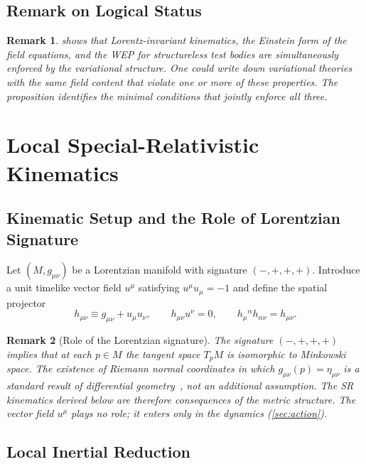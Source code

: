 \documentclass[12pt,a4paper]{article}
\newtheorem{remark}{Remark}
\begin{document}
\subsection{Remark on Logical Status}

\begin{remark}
 shows that Lorentz-invariant kinematics, the Einstein form
of the field equations, and the WEP for structureless test bodies are
simultaneously enforced by the variational structure. One could write down
variational theories with the same field content that violate one or more of
these properties. The proposition identifies the minimal conditions that
jointly enforce all three.
\end{remark}

\section{Local Special-Relativistic Kinematics}
\label{sec:kinematics}

\subsection{Kinematic Setup and the Role of Lorentzian Signature}


Let $(M,g_{\mu\nu})$ be a Lorentzian manifold with signature $(-,+,+,+)$.
Introduce a unit timelike vector field $u^{\mu}$ satisfying
$u^{\mu}u_{\mu}=-1$ and define the spatial projector
\begin{equation}
  h_{\mu\nu}\equiv g_{\mu\nu}+u_{\mu}u_{\nu},\qquad
  h_{\mu\nu}u^{\nu}=0,\qquad
  h_{\mu}{}^{\alpha}h_{\alpha\nu}=h_{\mu\nu}.
\end{equation}

\begin{remark}[Role of the Lorentzian signature]
The signature $(-,+,+,+)$ implies that at each $p\in M$ the tangent space
$T_{p}M$ is isomorphic to Minkowski space. The existence of Riemann normal
coordinates in which $g_{\mu\nu}(p)=\eta_{\mu\nu}$ is a standard result of
differential geometry~\citep{misner1973,carroll2004}, not an additional
assumption. The SR kinematics derived below are therefore \emph{consequences
of the metric structure}. The vector field $u^{\mu}$ plays no role; it enters
only in the dynamics (\cref{sec:action}).
\end{remark}

\subsection{Local Inertial Reduction}
\end{document}
